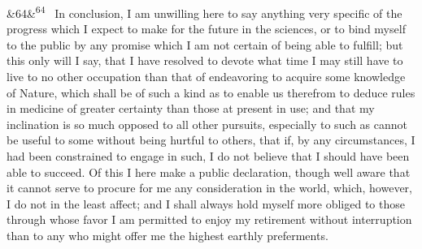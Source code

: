 \documentclass[12pt]{article}
\newcommand{\para}[1][]{\par\noindent\ifx&#1&\else\textsuperscript{\footnotesize #1}~\fi}
\begin{document}
\para[64] In conclusion, I am unwilling here to say anything very specific of the progress which I expect to make for the future in the sciences, or to bind myself to the public by any promise which I am not certain of being able to fulfill; but this only will I say, that I have resolved to devote what time I may still have to live to no other occupation than that of endeavoring to acquire some knowledge of Nature, which shall be of such a kind as to enable us therefrom to deduce rules in medicine of greater certainty than those at present in use; and that my inclination is so much opposed to all other pursuits, especially to such as cannot be useful to some without being hurtful to others, that if, by any circumstances, I had been constrained to engage in such, I do not believe that I should have been able to succeed. Of this I here make a public declaration, though well aware that it cannot serve to procure for me any consideration in the world, which, however, I do not in the least affect; and I shall always hold myself more obliged to those through whose favor I am permitted to enjoy my retirement without interruption than to any who might offer me the highest earthly preferments.

\end{document}
